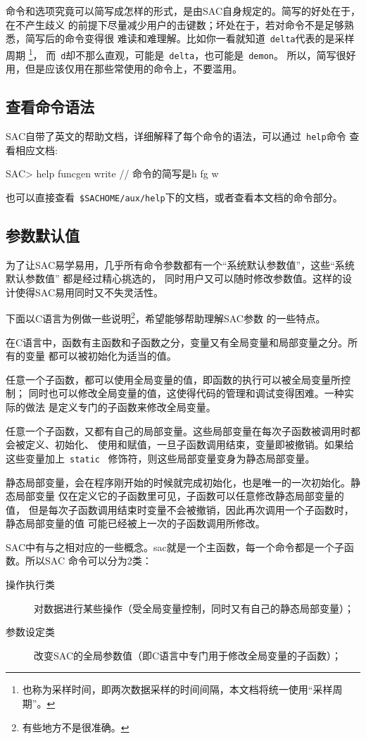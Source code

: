 命令和选项究竟可以简写成怎样的形式，是由SAC自身规定的。简写的好处在于，在不产生歧义
的前提下尽量减少用户的击键数；坏处在于，若对命令不是足够熟悉，简写后的命令变得很
难读和难理解。比如你一看就知道~\verb+delta+代表的是采样周期
\footnote{也称为采样时间，即两次数据采样的时间间隔，本文档将统一使用``采样周期''。}，
而~\verb+d+却不那么直观，可能是~\verb+delta+，也可能是~\verb+demon+。
所以，简写很好用，但是应该仅用在那些常使用的命令上，不要滥用。

\subsection{查看命令语法}
SAC自带了英文的帮助文档，详细解释了每个命令的语法，可以通过~\verb+help+命令
查看相应文档:
\begin{SACCode}
SAC> help funcgen write   // 命令的简写是h fg w
\end{SACCode}
也可以直接查看~\verb+$SACHOME/aux/help+下的文档，或者查看本文档的命令部分。

\subsection{参数默认值}
为了让SAC易学易用，几乎所有命令参数都有一个``系统默认参数值''，这些``系统默认参数值''
都是经过精心挑选的，
同时用户又可以随时修改参数值。这样的设计使得SAC易用同时又不失灵活性。

下面以C语言为例做一些说明\footnote{有些地方不是很准确。}，希望能够帮助理解SAC参数
的一些特点。

在C语言中，函数有主函数和子函数之分，变量又有全局变量和局部变量之分。所有的变量
都可以被初始化为适当的值。

任意一个子函数，都可以使用全局变量的值，即函数的执行可以被全局变量所控制；
同时也可以修改全局变量的值，这使得代码的管理和调试变得困难。一种实际的做法
是定义专门的子函数来修改全局变量。

任意一个子函数，又都有自己的局部变量。这些局部变量在每次子函数被调用时都会被定义、初始化、
使用和赋值，一旦子函数调用结束，变量即被撤销。如果给这些变量加上~\verb+static+~
修饰符，则这些局部变量变身为静态局部变量。

静态局部变量，会在程序刚开始的时候就完成初始化，也是唯一的一次初始化。静态局部变量
仅在定义它的子函数里可见，子函数可以任意修改静态局部变量的值，
但是每次子函数调用结束时变量不会被撤销，因此再次调用一个子函数时，静态局部变量的值
可能已经被上一次的子函数调用所修改。

SAC中有与之相对应的一些概念。sac就是一个主函数，每一个命令都是一个子函数。所以SAC
命令可以分为2类：
\begin{description}
\item[操作执行类] 对数据进行某些操作（受全局变量控制，同时又有自己的静态局部变量）；
\item[参数设定类] 改变SAC的全局参数值（即C语言中专门用于修改全局变量的子函数）；
\end{description}

